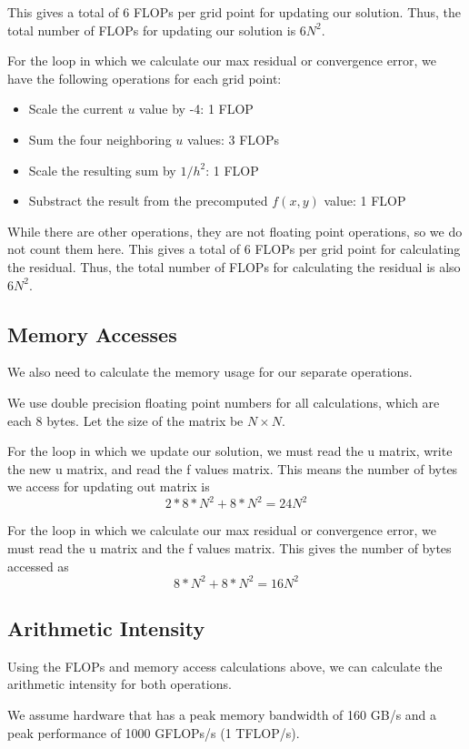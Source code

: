 \documentclass[11pt]{article}
\begin{document}
This gives a total of 6 FLOPs per grid point for updating our solution. Thus, the total number of FLOPs for updating our solution is \(6N^2\).

For the loop in which we calculate our max residual or convergence error, we have the following operations for each grid point:
\begin{itemize}
    \item Scale the current $u$ value by -4: 1 FLOP
    \item Sum the four neighboring $u$ values: 3 FLOPs
    \item Scale the resulting sum by \(1/h^2\): 1 FLOP
    \item Substract the result from the precomputed $f(x, y)$ value: 1 FLOP
\end{itemize}

While there are other operations, they are not floating point operations, so we do not count them here. This gives a total of 6 FLOPs per grid point for calculating the residual. Thus, the total number of FLOPs for calculating the residual is also \(6N^2\).

\subsection*{Memory Accesses}

We also need to calculate the memory usage for our separate operations. 

We use double precision floating point numbers for all calculations, which are each 8 bytes. Let the size of the matrix be $N \times N$.

For the loop in which we update our solution, we must read the u matrix, write the new u matrix, and read the f values matrix. This means the number of bytes we access for updating out matrix is
\[
    2 * 8 * N^2 + 8 * N^2 = 24N^2
\]

For the loop in which we calculate our max residual or convergence error, we must read the u matrix and the f values matrix. This gives the number of bytes accessed as
\[
    8 * N^2 + 8 * N^2 = 16N^2
\]

\subsection*{Arithmetic Intensity}

Using the FLOPs and memory access calculations above, we can calculate the arithmetic intensity for both operations.

We assume hardware that has a peak memory bandwidth of 160 GB/s and a peak performance of 1000 GFLOPs/s (1 TFLOP/s).
\end{document}
